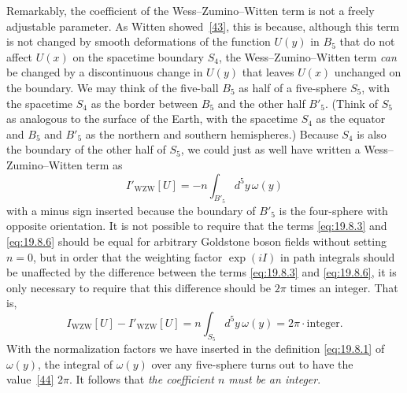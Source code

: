 Remarkably, the coefficient of the Wess--Zumino--Witten term is not a freely adjustable parameter. As Witten showed~\hyperref[ch19-ref-43]{[43]}, this is because, although this term is not changed by smooth deformations of the function $U(y)$ in $B_5$ that do not affect $U(x)$ on the spacetime boundary $S_4$, the Wess--Zumino--Witten term \emph{can} be changed by a discontinuous change in $U(y)$ that leaves $U(x)$ unchanged on the boundary. We may think of the five-ball $B_5$ as half of a five-sphere $S_5$, with the spacetime $S_4$ as the border between $B_5$ and the other half $B'_5$. (Think of $S_5$ as analogous to the surface of the Earth, with the spacetime $S_4$ as the equator and $B_5$ and $B'_5$ as the northern and southern hemispheres.) Because $S_4$ is also the boundary of the other half of $S_5$, we could just as well have written a Wess--Zumino--Witten term as
\begin{equation}
I'_{\mathrm{WZW}}[U]
=-n\int_{B'_5}d^5y\,\omega(y)
\tag{19.8.6}\label{eq:19.8.6}
\end{equation}
with a minus sign inserted because the boundary of $B'_5$ is the four-sphere with opposite orientation. It is not possible to require that the terms \eqref{eq:19.8.3} and \eqref{eq:19.8.6} should be equal for arbitrary Goldstone boson fields without setting $n=0$, but in order that the weighting factor $\exp(iI)$ in path integrals should be unaffected by the difference between the terms \eqref{eq:19.8.3} and \eqref{eq:19.8.6}, it is only necessary to require that this difference should be $2\pi$ times an integer. That is,
\begin{equation}
I_{\mathrm{WZW}}[U]-I'_{\mathrm{WZW}}[U]
=n\int_{S_5}d^5y\,\omega(y)
=2\pi\cdot\text{integer}.
\tag{19.8.7}\label{eq:19.8.7}
\end{equation}
With the normalization factors we have inserted in the definition \eqref{eq:19.8.1} of $\omega(y)$, the integral of $\omega(y)$ over any five-sphere turns out to have the value~\hyperref[ch19-ref-44]{[44]} $2\pi$. It follows that \emph{the coefficient $n$ must be an integer}.

